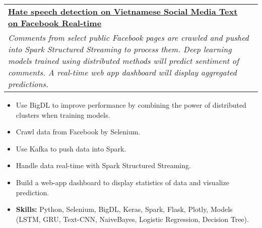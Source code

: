 \documentclass[letterpaper,11pt]{article}
\makeatletter
\newcommand{\resumeItem}[1]{
  \item\small{
    {#1 \vspace{-2pt}}
  }
}
\newcommand{\resumeProjectHeading}[3]{
  \vspace{-2pt}\item
  \begin{tabular*}{0.97\textwidth}{l@{\extracolsep{\fill}}r}
    \small #1 & #2 \\
    \multicolumn{2}{p{0.97\textwidth}}{\textit{\small #3}} %
  \end{tabular*}\vspace{-7pt}
}
\newcommand{\resumeItemListStart}{\begin{itemize}}
\newcommand{\resumeItemListEnd}{\end{itemize}\vspace{-5pt}}
\makeatother
\begin{document}
      \resumeProjectHeading
      {\href{https://www.researchgate.net/publication/375781867_A_Scalable_Hate_Speech_Detection_System_for_Vietnamese_Social_Media_using_Real-time_Big_Data_Processing_and_Distributed_Deep_Learning}{\textbf{Hate speech detection on Vietnamese Social Media Text on Facebook Real-time}} }
      {}
      {Comments from select public Facebook pages are crawled and pushed into 
      Spark Structured Streaming to process them. Deep learning models trained using distributed methods will predict sentiment of comments. 
      A real-time web app dashboard will display aggregated predictions.}
        \resumeItemListStart
          \resumeItem{Use BigDL to improve performance by combining the power of distributed clusters when training models.}
          \resumeItem{Crawl data from Facebook by Selenium.}
          \resumeItem{Use Kafka to push data into Spark.}
          \resumeItem{Handle data real-time with Spark Structured Streaming.}
          \resumeItem{Build a web-app dashboard to display statistics of data and visualize prediction.}
          \resumeItem{\textbf{Skills:} Python, Selenium, BigDL, Keras, Spark, Flask, Plotly, 
          Models (LSTM, GRU, Text-CNN, NaiveBayes, Logistic Regression, Decision Tree).}
        \resumeItemListEnd

\end{document}
